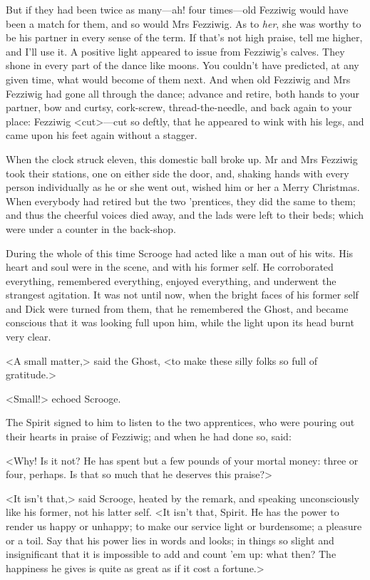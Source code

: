 But if they had been twice as many—ah! four times—old Fezziwig would have been a
match for them, and so would Mrs Fezziwig. As to \emph{her}, she was worthy to
be his partner in every sense of the term. If that's not high praise, tell me
higher, and I'll use it. A positive light appeared to issue from Fezziwig's
calves. They shone in every part of the dance like moons. You couldn't have
predicted, at any given time, what would become of them next. And when old
Fezziwig and Mrs Fezziwig had gone all through the dance; advance and retire,
both hands to your partner, bow and curtsy, cork-screw, thread-the-needle, and
back again to your place: Fezziwig <cut>—cut so deftly, that he appeared to wink
with his legs, and came upon his feet again without a stagger.

When the clock struck eleven, this domestic ball broke up. Mr and Mrs Fezziwig
took their stations, one on either side the door, and, shaking hands with every
person individually as he or she went out, wished him or her a Merry Christmas.
When everybody had retired but the two 'prentices, they did the same to them;
and thus the cheerful voices died away, and the lads were left to their beds;
which were under a counter in the back-shop.

During the whole of this time Scrooge had acted like a man out of his wits. His
heart and soul were in the scene, and with his former self. He corroborated
everything, remembered everything, enjoyed everything, and underwent the
strangest agitation. It was not until now, when the bright faces of his former
self and Dick were turned from them, that he remembered the Ghost, and became
conscious that it was looking full upon him, while the light upon its head burnt
very clear.

<A small matter,> said the Ghost, <to make these silly folks so full of
gratitude.>

<Small!> echoed Scrooge.

The Spirit signed to him to listen to the two apprentices, who were pouring out
their hearts in praise of Fezziwig; and when he had done so, said:

<Why! Is it not? He has spent but a few pounds of your mortal money: three or
four, perhaps. Is that so much that he deserves this praise?>

<It isn't that,> said Scrooge, heated by the remark, and speaking unconsciously
like his former, not his latter self. <It isn't that, Spirit. He has the power
to render us happy or unhappy; to make our service light or burdensome; a
pleasure or a toil. Say that his power lies in words and looks; in things so
slight and insignificant that it is impossible to add and count 'em up: what
then? The happiness he gives is quite as great as if it cost a fortune.>

